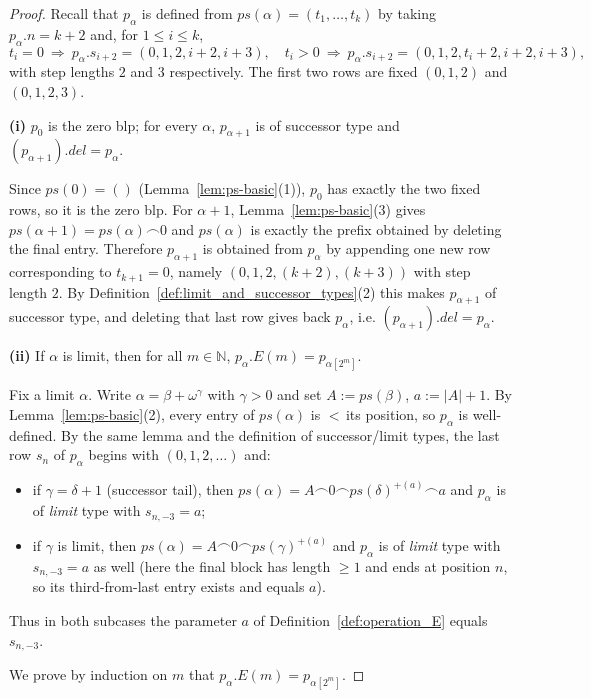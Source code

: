 \documentclass{article}
\theoremstyle{definition}
\theoremstyle{remark}
\begin{document}
\begin{proof}
Recall that $p_\alpha$ is defined from $ps(\alpha)=(t_1,\dots,t_k)$ by taking
$p_\alpha.n=k+2$ and, for $1\le i\le k$,
\[
t_i=0 \ \Rightarrow\ p_\alpha.s_{i+2}=(0,1,2,i+2,i+3),\quad
t_i>0 \ \Rightarrow\ p_\alpha.s_{i+2}=(0,1,2,t_i+2,i+2,i+3),
\]
with step lengths $2$ and $3$ respectively. The first two rows are fixed
$(0,1,2)$ and $(0,1,2,3)$.

\smallskip
\noindent\textbf{(i) } $p_0$ is the zero blp; for every $\alpha$, $p_{\alpha+1}$ is of successor type and $(p_{\alpha+1})\!.del=p_\alpha$.

Since $ps(0)=()$ (Lemma~\ref{lem:ps-basic}(1)), $p_0$ has exactly the two fixed rows, so it is the zero blp.
For $\alpha+1$, Lemma~\ref{lem:ps-basic}(3) gives
\(
ps(\alpha+1)=ps(\alpha)\frown 0
\)
and $ps(\alpha)$ is exactly the prefix obtained by deleting the final entry.
Therefore $p_{\alpha+1}$ is obtained from $p_\alpha$ by appending one new row
corresponding to $t_{k+1}=0$, namely $(0,1,2,(k+2),(k+3))$ with step length $2$.
By Definition~\ref{def:limit_and_successor_types}(2) this makes $p_{\alpha+1}$ of
successor type, and deleting that last row gives back $p_\alpha$, i.e.
$(p_{\alpha+1})\!.del=p_\alpha$.

\smallskip
\noindent\textbf{(ii) } If $\alpha$ is limit, then for all $m\in\mathbb{N}$,
\(
p_\alpha.E(m)=p_{\alpha[2^m]}.
\)

Fix a limit $\alpha$. Write $\alpha=\beta+\omega^\gamma$ with $\gamma>0$ and set
$A:=ps(\beta)$, $a:=|A|+1$. By Lemma~\ref{lem:ps-basic}(2), every entry of $ps(\alpha)$ is
$<\,$its position, so $p_\alpha$ is well-defined. By the same lemma and the
definition of successor/limit types, the last row $s_{n}$ of $p_\alpha$ begins with
$(0,1,2,\dots)$ and:
\begin{itemize}
  \item if $\gamma=\delta+1$ (successor tail), then $ps(\alpha)=A\frown 0\frown ps(\delta)^{+(a)}\frown a$ and $p_\alpha$ is of \emph{limit} type with $s_{n,-3}=a$;
  \item if $\gamma$ is limit, then $ps(\alpha)=A\frown 0\frown ps(\gamma)^{+(a)}$ and $p_\alpha$ is of \emph{limit} type with $s_{n,-3}=a$ as well (here the final block has length $\ge1$ and ends at position $n$, so its third-from-last entry exists and equals $a$).
\end{itemize}
Thus in both subcases the parameter $a$ of Definition~\ref{def:operation_E} equals
$s_{n,-3}$.

We prove by induction on $m$ that $p_\alpha.E(m)=p_{\alpha[2^m]}$.


\end{proof}
\end{document}
